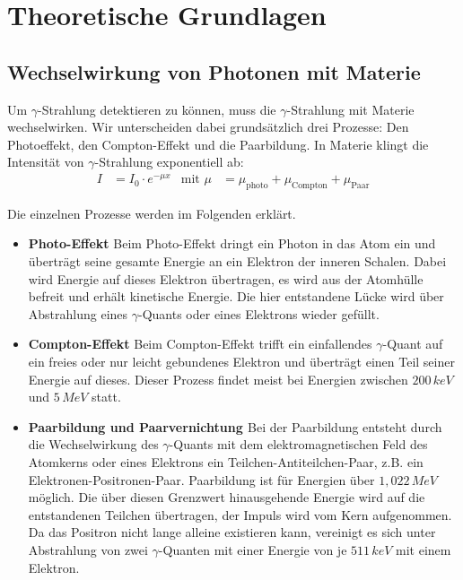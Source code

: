 \section{Theoretische Grundlagen}

\subsection{Wechselwirkung von Photonen mit Materie}

Um $\gamma$-Strahlung detektieren zu können, muss die $\gamma$-Strahlung mit Materie wechselwirken. Wir unterscheiden dabei grundsätzlich drei Prozesse: Den Photoeffekt, den Compton-Effekt und die Paarbildung. In Materie klingt die Intensität von $\gamma$-Strahlung exponentiell ab:
\begin{align}
I&= I_0\cdot e^{-\mu x}
&\text{mit } 
\mu &= \mu_\text{photo} + \mu_\text{Compton} + \mu_\text{Paar}
\end{align}

Die einzelnen Prozesse werden im Folgenden erklärt.\cite{demtroeder}

\begin{itemize}
\item \textbf{Photo-Effekt}
Beim Photo-Effekt dringt ein Photon in das Atom ein und überträgt seine gesamte Energie an ein Elektron der inneren Schalen. Dabei wird Energie auf dieses Elektron übertragen, es wird aus der Atomhülle befreit und erhält kinetische Energie. Die hier entstandene Lücke wird über Abstrahlung eines $\gamma$-Quants oder eines Elektrons wieder gefüllt.

\item\textbf{Compton-Effekt}
Beim Compton-Effekt trifft ein einfallendes $\gamma$-Quant auf ein freies oder nur leicht gebundenes Elektron und überträgt einen Teil seiner Energie auf dieses. Dieser Prozess findet meist bei Energien zwischen $200\,\si{keV}$ und $5\,\si{MeV}$ statt.

\item\textbf{Paarbildung und Paarvernichtung \label{PVN1}}
Bei der Paarbildung entsteht durch die Wechselwirkung des $\gamma$-Quants mit dem elektromagnetischen Feld des Atomkerns oder eines Elektrons ein Teilchen-Antiteilchen-Paar, z.B. ein Elektronen-Positronen-Paar. Paarbildung ist für Energien über $1,022\,\si{MeV}$ möglich. Die über diesen Grenzwert hinausgehende Energie wird auf die entstandenen Teilchen übertragen, der Impuls wird vom Kern aufgenommen. Da das Positron nicht lange alleine existieren kann, vereinigt es sich unter Abstrahlung von zwei $\gamma$-Quanten mit einer Energie von je $511\,\si{keV}$ mit einem Elektron.
\end{itemize}

